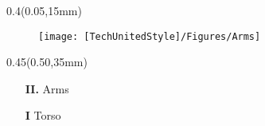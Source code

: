 \documentclass[aspectratio=43]{beamer}
\newcommand{\TULeftMargin}{0.05\paperwidth}
\newcommand{\TULeftWidth}{0.4\paperwidth}
\newcommand{\TURightMargin}{0.50\paperwidth}
\newcommand{\TURightWidth}{0.45\paperwidth}
\begin{document}
	\begin{frame}
	
		\begin{textblock*}{\TULeftWidth}(\TULeftMargin,15mm)
			\begin{figure}
				\centering
				\texttt{[image: [TechUnitedStyle]/Figures/Arms]}
			\end{figure}
		\end{textblock*}
		
	\begin{textblock*}{\TURightWidth}(\TURightMargin,35mm)
		
			\begin{itemize}
				\item[\textcolor{TechUnitedGreen}{\textbf{II.}}] Arms
			
			
				\item[\textcolor{TechUnitedGreen}{\textbf{I}}] Torso
				
			\end{itemize}
	\end{textblock*}	
	
	\end{frame}
	
\end{document}
